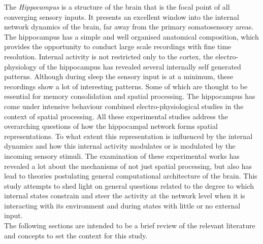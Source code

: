 The \emph{Hippocampus} is a structure of the brain that is the focal point of all converging sensory inputs. It presents an excellent window into the internal network dynamics of the brain, far away from the primary somatosensory areas. The hippocampus has a simple and well organised anatomical composition, which provides the opportunity to conduct large scale recordings with fine time resolution. Internal activity is not restricted only to the cortex, the electro-physiology of the hippocampus has revealed several internally self generated patterns. Although during sleep the sensory input is at a minimum, these recordings show a lot of interesting patterns. Some of which are thought to be essential for memory consolidation and spatial processing.  
The hippocampus has come under intensive behaviour combined electro-physiological studies in the context of spatial processing. All these experimental studies address the overarching questions of how the hippocampal network forms spatial representations. To what extent this representation is influenced by the internal dynamics and how this internal activity modulates or is modulated by the incoming sensory stimuli. The examination of these experimental works has revealed a lot about the mechanisms of not just spatial processing, but also has lead to theories postulating general computational architecture of the brain. This study attempts to shed light on general questions related to the degree to which internal states constrain and steer the activity at the network level when it is interacting with its environment and during states with little or no external input. \\
The following sections are intended to be a brief review of the relevant literature and concepts to set the context for this study.





%
%
%
%


